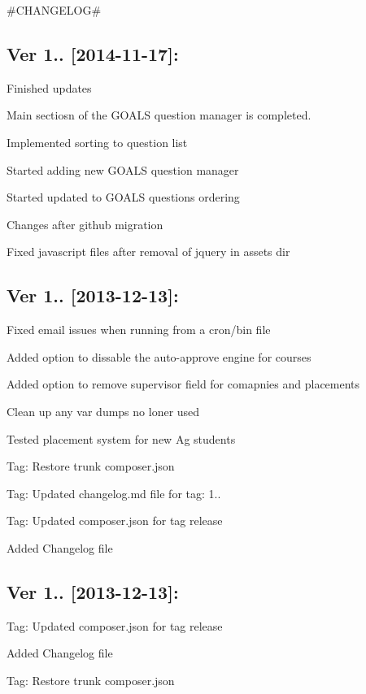 \#\+C\+H\+A\+N\+G\+E\+L\+O\+G\#

\subsection*{Ver 1.. \mbox{[}2014-\/11-\/17\mbox{]}\+: }


\begin{DoxyItemize}
\item Finished updates
\item Main sectiosn of the G\+O\+A\+L\+S question manager is completed.
\item Implemented sorting to question list
\item Started adding new G\+O\+A\+L\+S question manager
\item Started updated to G\+O\+A\+L\+S questions ordering
\item Changes after github migration
\item Fixed javascript files after removal of jquery in assets dir
\end{DoxyItemize}

\subsection*{Ver 1.. \mbox{[}2013-\/12-\/13\mbox{]}\+: }


\begin{DoxyItemize}
\item Fixed email issues when running from a cron/bin file
\item Added option to dissable the auto-\/approve engine for courses
\item Added option to remove supervisor field for comapnies and placements
\item Clean up any var dumps no loner used
\item Tested placement system for new Ag students
\item Tag\+: Restore trunk composer.\+json
\item Tag\+: Updated changelog.\+md file for tag\+: 1..
\item Tag\+: Updated composer.\+json for tag release
\item Added Changelog file
\end{DoxyItemize}

\subsection*{Ver 1.. \mbox{[}2013-\/12-\/13\mbox{]}\+: }


\begin{DoxyItemize}
\item Tag\+: Updated composer.\+json for tag release
\item Added Changelog file
\item Tag\+: Restore trunk composer.\+json 
\end{DoxyItemize}